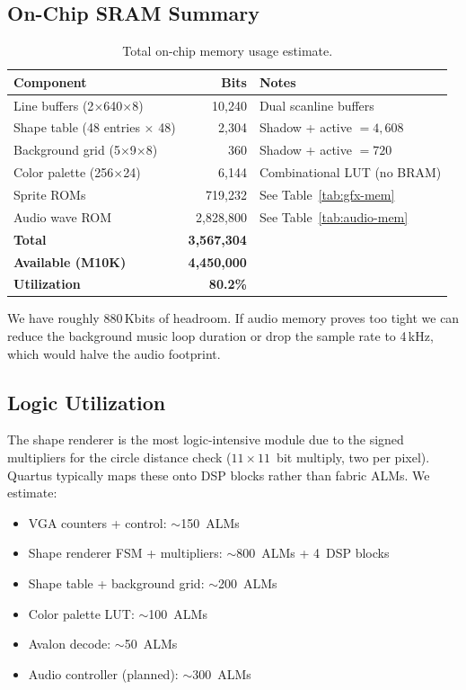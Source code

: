 \documentclass[11pt,letterpaper]{article}
\begin{document}
\subsection{On-Chip SRAM Summary}

\begin{table}[H]
\centering
\caption{Total on-chip memory usage estimate.}
\label{tab:sram}
\begin{tabular}{l r l}
\toprule
\textbf{Component} & \textbf{Bits} & \textbf{Notes} \\
\midrule
Line buffers (2$\times$640$\times$8)   &    10{,}240 & Dual scanline buffers \\
Shape table (48 entries $\times$ 48)    &     2{,}304 & Shadow + active $= 4{,}608$ \\
Background grid (5$\times$9$\times$8)  &       360   & Shadow + active $= 720$ \\
Color palette (256$\times$24)           &     6{,}144 & Combinational LUT (no BRAM) \\
Sprite ROMs                             &   719{,}232 & See Table~\ref{tab:gfx-mem} \\
Audio wave ROM                          & 2{,}828{,}800 & See Table~\ref{tab:audio-mem} \\
\midrule
\textbf{Total}                          & \textbf{3{,}567{,}304} & \\
\textbf{Available (M10K)}              & \textbf{4{,}450{,}000} & \\
\textbf{Utilization}                    & \textbf{80.2\%} & \\
\bottomrule
\end{tabular}
\end{table}

We have roughly 880\,Kbits of headroom. If audio memory proves too
tight we can reduce the background music loop duration or drop the
sample rate to 4\,kHz, which would halve the audio footprint.

\subsection{Logic Utilization}

The shape renderer is the most logic-intensive module due to the
signed multipliers for the circle distance check ($11 \times 11$~bit
multiply, two per pixel). Quartus typically maps these onto DSP blocks
rather than fabric ALMs. We estimate:

\begin{itemize}[nosep]
  \item VGA counters + control: $\sim$150~ALMs
  \item Shape renderer FSM + multipliers: $\sim$800~ALMs + 4~DSP blocks
  \item Shape table + background grid: $\sim$200~ALMs
  \item Color palette LUT: $\sim$100~ALMs
  \item Avalon decode: $\sim$50~ALMs
  \item Audio controller (planned): $\sim$300~ALMs
\end{itemize}
\end{document}
